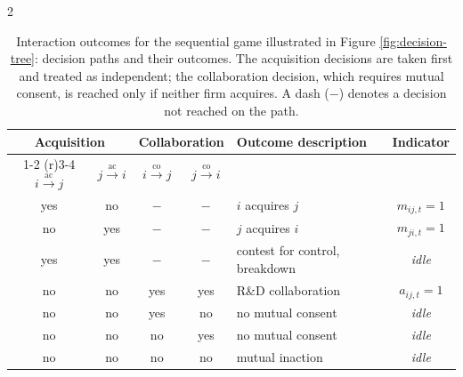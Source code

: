\documentclass[12pt]{article}
\begin{document}
\begin{spacing}{2}
\begin{table}[htbp]
\centering
\begin{threeparttable}
\caption{\label{tab:outcomes-seq} Interaction outcomes for the sequential
game illustrated in Figure \ref{fig:decision-tree}: decision paths and their outcomes. The acquisition
decisions are taken first and treated as independent; the collaboration
decision, which requires mutual consent, is reached only if neither firm
acquires. A dash ($-$) denotes a decision not reached on the path.}
\begin{tabular}{@{} c c c c l c @{}}
\toprule
\multicolumn{2}{c}{Acquisition} & \multicolumn{2}{c}{Collaboration} &
\multirow{2}{*}{Outcome description} & \multirow{2}{*}{Indicator} \\
\cmidrule(r){1-2} \cmidrule(r){3-4}
$i \xrightarrow{\mathrm{ac}} j$ & $j \xrightarrow{\mathrm{ac}} i$ &
$i \xrightarrow{\mathrm{co}} j$ & $j \xrightarrow{\mathrm{co}} i$ &  &  \\
\midrule
yes & no  & $-$ & $-$ & $i$ acquires $j$           & $m_{ij,t}=1$ \\
no  & yes & $-$ & $-$ & $j$ acquires $i$           & $m_{ji,t}=1$ \\
yes & yes & $-$ & $-$ & contest for control, breakdown   & \textit{idle} \\
no  & no  & yes & yes & R\&D collaboration        & $a_{ij,t}=1$ \\
no  & no  & yes & no  & no mutual consent         & \textit{idle} \\
no  & no  & no  & yes & no mutual consent         & \textit{idle} \\
no  & no  & no  & no  & mutual inaction           & \textit{idle} \\
\bottomrule
\end{tabular}
\end{threeparttable}
\end{table}


\end{spacing}
\end{document}
